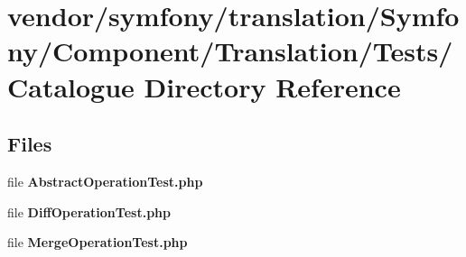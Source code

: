 \section{vendor/symfony/translation/\+Symfony/\+Component/\+Translation/\+Tests/\+Catalogue Directory Reference}
\label{dir_e160909beb526fee0e85ed946c5a8371}
\subsection*{Files}
\begin{DoxyCompactItemize}
\item 
file {\bf Abstract\+Operation\+Test.\+php}
\item 
file {\bf Diff\+Operation\+Test.\+php}
\item 
file {\bf Merge\+Operation\+Test.\+php}
\end{DoxyCompactItemize}
